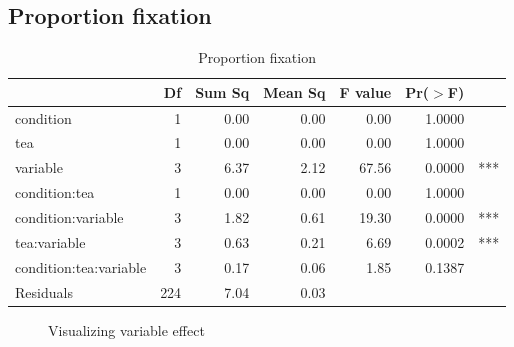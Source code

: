 \documentclass{article}
\begin{document}
\subsection{Proportion fixation}

\begin{table}[H]
\centering
\caption{Proportion fixation}
\begin{tabular}{lrrrrrr}
  \hline
 & Df & Sum Sq & Mean Sq & F value & Pr($>$F) & \\ 
  \hline
  condition              & 1 & 0.00 & 0.00 & 0.00 & 1.0000 & \\ 
  tea                    & 1 & 0.00 & 0.00 & 0.00 & 1.0000 & \\ 
  variable               & 3 & 6.37 & 2.12 & 67.56 & 0.0000 & ***\\ 
  condition:tea          & 1 & 0.00 & 0.00 & 0.00 & 1.0000 & \\ 
  condition:variable     & 3 & 1.82 & 0.61 & 19.30 & 0.0000 & ***\\ 
  tea:variable           & 3 & 0.63 & 0.21 & 6.69 & 0.0002 & ***\\ 
  condition:tea:variable & 3 & 0.17 & 0.06 & 1.85 & 0.1387 & \\ 
  Residuals              & 224 & 7.04 & 0.03 &  & & \\ 
   \hline
\end{tabular}
\end{table}

\begin{figure}[H]
  \caption{Visualizing variable effect}
  \noindent{}
  \centering
\end{figure}
\end{document}
